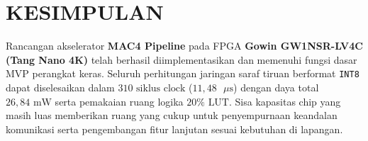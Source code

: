 \documentclass[12pt,a4paper]{article}
\begin{document}
\section{KESIMPULAN}

Rancangan akselerator \textbf{MAC4 Pipeline} pada FPGA \textbf{Gowin GW1NSR-LV4C (Tang Nano 4K)} telah berhasil diimplementasikan dan memenuhi fungsi dasar MVP perangkat keras. Seluruh perhitungan jaringan saraf tiruan berformat \texttt{INT8} dapat diselesaikan dalam $310\text{ siklus clock}$ ($11{,}48\text{ }\mu\text{s}$) dengan daya total $26{,}84\text{ mW}$ serta pemakaian ruang logika $20\%\text{ LUT}$. Sisa kapasitas chip yang masih luas memberikan ruang yang cukup untuk penyempurnaan keandalan komunikasi serta pengembangan fitur lanjutan sesuai kebutuhan di lapangan.
\end{document}
